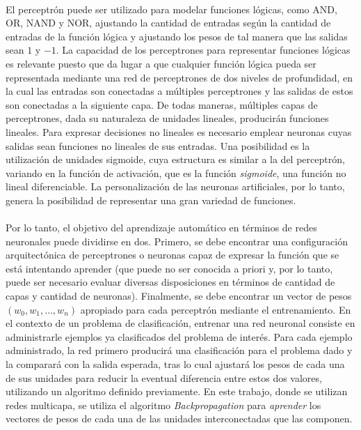 \paragraph{}El perceptrón puede ser utilizado para modelar funciones lógicas, como AND, OR, NAND y NOR, ajustando la cantidad de entradas según la cantidad de entradas de la función lógica y ajustando los pesos de tal manera que las salidas sean $1$ y $-1$.
La capacidad de los perceptrones para representar funciones lógicas es relevante puesto que da lugar a que cualquier función lógica pueda ser representada mediante una red de perceptrones de dos niveles de profundidad, en la cual las entradas son conectadas a múltiples perceptrones y las salidas de estos son conectadas a la siguiente capa.
De todas maneras, múltiples capas de perceptrones, dada su naturaleza de unidades lineales, producirán funciones lineales.
Para expresar decisiones no lineales es necesario emplear neuronas cuyas salidas sean funciones no lineales de sus entradas.
Una posibilidad es la utilización de unidades sigmoide, cuya estructura es similar a la del perceptrón, variando en la función de activación, que es la función \textit{sigmoide}, una función no lineal diferenciable.
La personalización de las neuronas artificiales, por lo tanto, genera la posibilidad de representar una gran variedad de funciones.

\paragraph{}Por lo tanto, el objetivo del aprendizaje automático en términos de redes neuronales puede dividirse en dos.
Primero, se debe encontrar una configuración arquitectónica de perceptrones o neuronas capaz de expresar la función que se está intentando aprender (que puede no ser conocida a priori y, por lo tanto, puede ser necesario evaluar diversas disposiciones en términos de cantidad de capas y cantidad de neuronas).
Finalmente, se debe encontrar un vector de pesos $(w_0,w_1,\dots,w_n)$ apropiado para cada perceptrón mediante el entrenamiento. 
En el contexto de un problema de clasificación, entrenar una red neuronal consiste en administrarle ejemplos ya clasificados del problema de interés.
Para cada ejemplo administrado, la red primero producirá una clasificación para el problema dado y la comparará con la salida esperada, tras lo cual ajustará los pesos de cada una de sus unidades para reducir la eventual diferencia entre estos dos valores, utilizando un algoritmo definido previamente.
En este trabajo, donde se utilizan redes multicapa, se utiliza el algoritmo \textit{Backpropagation} para \textit{aprender} los vectores de pesos de cada una de las unidades interconectadas que las componen. 

